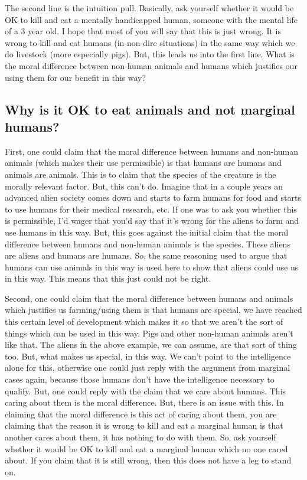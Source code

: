 The second line is the intuition pull. Basically, ask yourself whether it would be OK to kill and eat a mentally handicapped human, someone with the mental life of a 3 year old. I hope that most of you will say that this is just wrong. It is wrong to kill and eat humans (in non-dire situations) in the same way which we do livestock (more especially pigs). But, this leads us into the first line. What is the moral difference between non-human animals and humans which justifies our using them for our benefit in this way?

\subsection{Why is it OK to eat animals and not marginal humans?}
 
First, one could claim that the moral difference between humans and non-human animals (which makes their use permissible) is that humans are humans and animals are animals. This is to claim that the species of the creature is the morally relevant factor. But, this can't do. Imagine that in a couple years an advanced alien society comes down and starts to farm humans for food and starts to use humans for their medical research, etc. If one was to ask you whether this is permissible, I'd wager that you'd say that it's wrong for the aliens to farm and use humans in this way. But, this goes against the initial claim that the moral difference between humans and non-human animals is the species. These aliens are aliens and humans are humans. So, the same reasoning used  to argue that humans can use animals in this way is used here to show that aliens could use us in this way. This means that this just could not be right.

Second, one could claim that the moral difference between humans and animals which justifies us farming/using them is that humans are special,  we have reached this certain level of development which makes it so that we aren't the sort of things which can be used in this way. Pigs and other non-human animals aren't like that. The aliens in the above example, we can assume, are that sort of thing too. But, what makes us special, in this way. We can't point to the intelligence alone for this, otherwise one could just reply with the argument from marginal cases again, because those humans don't have the intelligence necessary to qualify. But, one could reply with the claim that we care about humans. This caring about them is the moral difference. But, there is an issue with this. In claiming that the moral difference is this act of caring about them, you are claiming that the reason it is wrong to kill and eat a marginal human is that another cares about them, it has nothing to do with them. So, ask yourself whether it would be OK to kill and eat a marginal human which no one cared about. If you claim that it is still wrong, then this does not have a leg to stand on.

